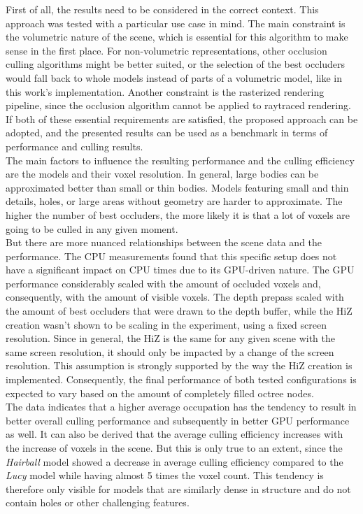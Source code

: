 \noindent
First of all, the results need to be considered in the correct context. This approach was tested with a particular use case 
in mind. The main constraint is the volumetric nature of the scene, which is essential for this algorithm to make sense in 
the first place. For non-volumetric representations, other occlusion culling algorithms might be better suited, or the 
selection of the best occluders would fall back to whole models instead of parts of a volumetric model, like in this work's 
implementation. Another constraint is the rasterized rendering pipeline, since the occlusion algorithm cannot be applied to 
raytraced rendering. If both of these essential requirements are satisfied, the proposed approach can be adopted, and the 
presented results can be used as a benchmark in terms of performance and culling results. \\

\noindent
The main factors to influence the resulting performance and the culling efficiency are the models and their voxel resolution.
In general, large bodies can be approximated better than small or thin bodies. Models featuring small and thin details, holes, 
or large areas without geometry are harder to approximate. The higher the number of best occluders, the more likely it is 
that a lot of voxels are going to be culled in any given moment. \\

\noindent
But there are more nuanced relationships between the scene data and the performance. The \ac{CPU} measurements found that this 
specific setup does not have a significant impact on \ac{CPU} times due to its \ac{GPU}-driven nature. The \ac{GPU} performance 
considerably scaled with the amount of occluded voxels and, consequently, with the amount of visible voxels. The depth prepass 
scaled with the amount of best occluders that were drawn to the depth buffer, while the \ac{HiZ} creation wasn't shown to be scaling 
in the experiment, using a fixed screen resolution. Since in general, the \ac{HiZ} is the same for any given scene with the same 
screen resolution, it should only be impacted by a change of the screen resolution. This assumption is strongly supported by the 
way the \ac{HiZ} creation is implemented. Consequently, the final performance of both tested configurations is expected to vary 
based on the amount of completely filled octree nodes. \\

The data indicates that a higher average occupation has the tendency to result in better overall culling performance and subsequently 
in better \ac{GPU} performance as well. It can also be derived that the average culling efficiency increases with the increase of 
voxels in the scene. But this is only true to an extent, since the \emph{Hairball} model showed a decrease in average culling efficiency 
compared to the \emph{Lucy} model while having almost 5 times the voxel count. This tendency is therefore only visible for models 
that are similarly dense in structure and do not contain holes or other challenging features.\\

